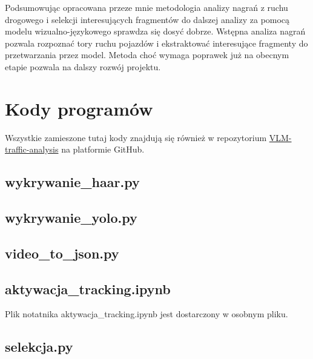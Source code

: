 \documentclass[a4paper]{article}
\begin{document}
Podsumowując opracowana przeze mnie metodologia analizy nagrań z ruchu drogowego i selekcji interesujących fragmentów do dalszej analizy za pomocą modelu wizualno-językowego sprawdza się dosyć dobrze. Wstępna analiza nagrań pozwala rozpoznać tory ruchu pojazdów i ekstraktować interesujące fragmenty do przetwarzania przez model. Metoda choć wymaga poprawek już na obecnym etapie pozwala na dalszy rozwój projektu.
\section{Kody programów}
Wszystkie zamieszone tutaj kody znajdują się również w repozytorium \href{https://github.com/Lukasz004/VLM-traffic-analysis}{VLM-traffic-analysis} na platformie GitHub.
\subsection{wykrywanie\_haar.py}

\subsection{wykrywanie\_yolo.py}

\subsection{video\_to\_json.py}

\subsection{aktywacja\_tracking.ipynb}
Plik notatnika aktywacja\_tracking.ipynb jest dostarczony w osobnym pliku.
\subsection{selekcja.py}

\end{document}
